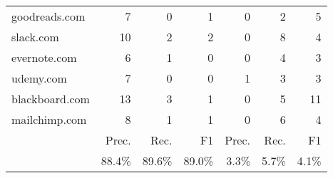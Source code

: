 \begin{table}[t]
\begin{tabularx}{0.85\columnwidth}{p{}rrr|rrr}
\small goodreads.com			& 7		& 0		& 1		& 0		& 2		& 5 \\
\small slack.com				& 10	& 2		& 2		& 0		& 8		& 4 \\
\small evernote.com			& 6		& 1		& 0		& 0		& 4		& 3 \\
\small udemy.com				& 7		& 0		& 0		& 1		& 3		& 3 \\
\small blackboard.com			& 13	& 3		& 1		& 0		& 5		& 11 \\
\small mailchimp.com			& 8		& 1		& 1		& 0		& 6		& 4 \\
\hline
						& Prec.						  & Rec.							 & F1							   & Prec.						  & Rec.							 & F1				 \\
						& 88.4\%						  & 89.6\%						 & 89.0\%						& 3.3\%					 	  & 5.7\%						 & 4.1\%			 \\

\end{tabularx}
\end{table}























